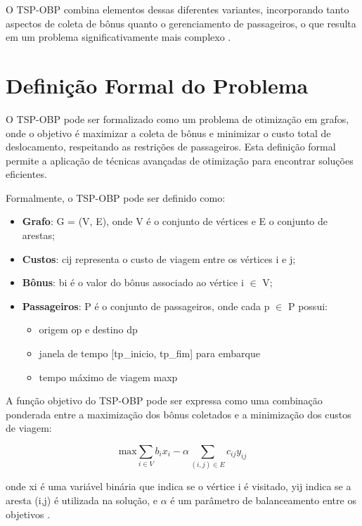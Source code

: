 \documentclass[12pt, a4paper]{report}
\begin{document}
O TSP-OBP combina elementos dessas diferentes variantes, incorporando tanto aspectos de coleta de bônus quanto o gerenciamento de passageiros, o que resulta em um problema significativamente mais complexo \cite{ramos}.

\section{Definição Formal do Problema}
O TSP-OBP pode ser formalizado como um problema de otimização em grafos, onde o objetivo é maximizar a coleta de bônus e minimizar o custo total de deslocamento, respeitando as restrições de passageiros. Esta definição formal permite a aplicação de técnicas avançadas de otimização para encontrar soluções eficientes.

Formalmente, o TSP-OBP pode ser definido como:

\begin{itemize}
    \item \textbf{Grafo}: G = (V, E), onde V é o conjunto de vértices e E o conjunto de arestas;
    \item \textbf{Custos}: cij representa o custo de viagem entre os vértices i e j;
    \item \textbf{Bônus}: bi é o valor do bônus associado ao vértice i $\in$ V;
    \item \textbf{Passageiros}: P é o conjunto de passageiros, onde cada p $\in$ P possui:
    \begin{itemize}
        \item origem op e destino dp
        \item janela de tempo [tp\_inicio, tp\_fim] para embarque
        \item tempo máximo de viagem maxp
    \end{itemize}
\end{itemize}

A função objetivo do TSP-OBP pode ser expressa como uma combinação ponderada entre a maximização dos bônus coletados e a minimização dos custos de viagem:

\begin{equation}
    \text{max} \sum_{i \in V} b_i x_i - \alpha \sum_{(i,j) \in E} c_{ij} y_{ij}
\end{equation}

onde xi é uma variável binária que indica se o vértice i é visitado, yij indica se a aresta (i,j) é utilizada na solução, e $\alpha$ é um parâmetro de balanceamento entre os objetivos \cite{lopesfilho2019}.
\end{document}

